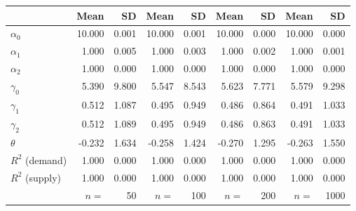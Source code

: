 
\begin{tabular}[t]{lrrrrrrrr}
\toprule
  & Mean & SD & Mean  & SD  & Mean   & SD   & Mean    & SD   \\
\midrule
$\alpha_{0}$ & 10.000 & 0.001 & 10.000 & 0.001 & 10.000 & 0.000 & 10.000 & 0.000\\
$\alpha_{1}$ & 1.000 & 0.005 & 1.000 & 0.003 & 1.000 & 0.002 & 1.000 & 0.001\\
$\alpha_{2}$ & 1.000 & 0.000 & 1.000 & 0.000 & 1.000 & 0.000 & 1.000 & 0.000\\
$\gamma_{0}$ & 5.390 & 9.800 & 5.547 & 8.543 & 5.623 & 7.771 & 5.579 & 9.298\\
$\gamma_{1}$ & 0.512 & 1.087 & 0.495 & 0.949 & 0.486 & 0.864 & 0.491 & 1.033\\
$\gamma_{2}$ & 0.512 & 1.089 & 0.495 & 0.949 & 0.486 & 0.863 & 0.491 & 1.033\\
$\theta$ & -0.232 & 1.634 & -0.258 & 1.424 & -0.270 & 1.295 & -0.263 & 1.550\\
$R^{2}$ (demand) & 1.000 & 0.000 & 1.000 & 0.000 & 1.000 & 0.000 & 1.000 & 0.000\\
$R^{2}$ (supply) & 1.000 & 0.000 & 1.000 & 0.000 & 1.000 & 0.000 & 1.000 & 0.000\\
 & $n =$ & 50 & $n =$ & 100 & $n =$ & 200 & $n =$ & 1000\\
\bottomrule
\end{tabular}
